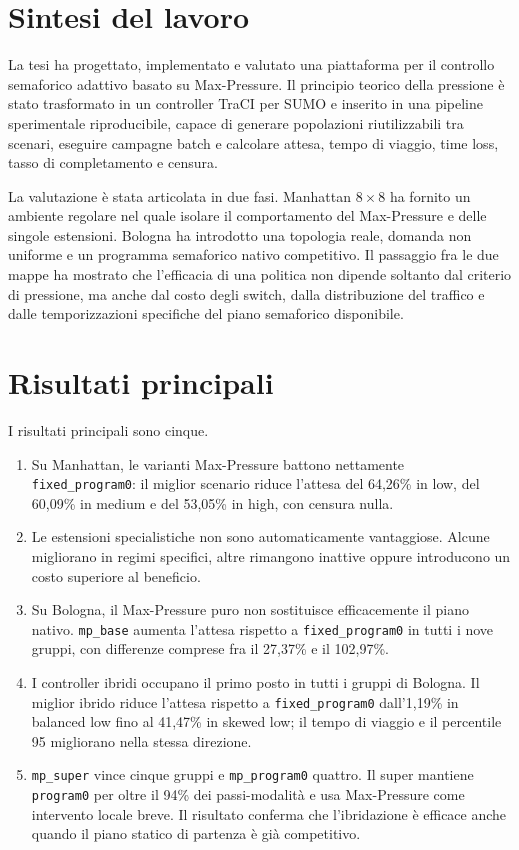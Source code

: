 \documentclass[12pt,a4paper,oneside]{report}
\numberwithin{equation}{chapter}
\begin{document}
\section{Sintesi del lavoro}

La tesi ha progettato, implementato e valutato una piattaforma per il controllo
semaforico adattivo basato su Max-Pressure. Il principio teorico della
pressione è stato trasformato in un controller TraCI per SUMO e inserito in una
pipeline sperimentale riproducibile, capace di generare popolazioni
riutilizzabili tra scenari, eseguire campagne batch e calcolare attesa, tempo
di viaggio, time loss, tasso di completamento e censura.

La valutazione è stata articolata in due fasi. Manhattan \(8\times8\) ha
fornito un ambiente regolare nel quale isolare il comportamento del
Max-Pressure e delle singole estensioni. Bologna ha introdotto una topologia
reale, domanda non uniforme e un programma semaforico nativo competitivo. Il
passaggio fra le due mappe ha mostrato che l'efficacia di una politica non
dipende soltanto dal criterio di pressione, ma anche dal costo degli switch,
dalla distribuzione del traffico e dalle temporizzazioni specifiche del piano
semaforico disponibile.

\section{Risultati principali}

I risultati principali sono cinque.

\begin{enumerate}
    \item Su Manhattan, le varianti Max-Pressure battono nettamente
    \texttt{fixed\_program0}: il miglior scenario riduce l'attesa del
    64,26\% in low, del 60,09\% in medium e del 53,05\% in high, con
    censura nulla.
    \item Le estensioni specialistiche non sono automaticamente vantaggiose.
    Alcune migliorano in regimi specifici, altre rimangono inattive oppure
    introducono un costo superiore al beneficio.
    \item Su Bologna, il Max-Pressure puro non sostituisce efficacemente il
    piano nativo. \texttt{mp\_base} aumenta l'attesa rispetto a
    \texttt{fixed\_program0} in tutti i nove gruppi, con differenze comprese
    fra il 27,37\% e il 102,97\%.
    \item I controller ibridi occupano il primo posto in tutti i gruppi di
    Bologna. Il miglior ibrido riduce l'attesa rispetto a
    \texttt{fixed\_program0} dall'1,19\%
    in balanced low fino al 41,47\% in skewed low; il tempo di viaggio e il
    percentile 95 migliorano nella stessa direzione.
    \item \texttt{mp\_super} vince cinque gruppi e
    \texttt{mp\_program0} quattro. Il super mantiene \texttt{program0} per
    oltre il 94\% dei passi-modalità e usa Max-Pressure come intervento
    locale breve. Il risultato conferma che l'ibridazione è efficace anche
    quando il piano statico di partenza è già competitivo.
\end{enumerate}
\end{document}
